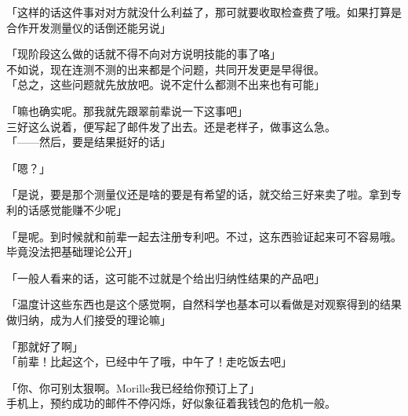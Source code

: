 「这样的话这件事对对方就没什么利益了，那可就要收取检查费了哦。如果打算是合作开发测量仪的话倒还能另说」

「现阶段这么做的话就不得不向对方说明技能的事了咯」\\

不如说，现在连测不测的出来都是个问题，共同开发更是早得很。\\

「总之，这些问题就先放放吧。说不定什么都测不出来也有可能」

「嘛也确实呢。那我就先跟翠前辈说一下这事吧」\\

三好这么说着，便写起了邮件发了出去。还是老样子，做事这么急。\\

「——然后，要是结果挺好的话」

「嗯？」

「是说，要是那个测量仪还是啥的要是有希望的话，就交给三好来卖了啦。拿到专利的话感觉能赚不少呢」

「是呢。到时候就和前辈一起去注册专利吧。不过，这东西验证起来可不容易哦。毕竟没法把基础理论公开」

「一般人看来的话，这可能不过就是个给出归纳性结果的产品吧」

「温度计这些东西也是这个感觉啊，自然科学也基本可以看做是对观察得到的结果做归纳，成为人们接受的理论嘛」

「那就好了啊」\\

「前辈！比起这个，已经中午了哦，中午了！走吃饭去吧」

「你、你可别太狠啊。Morille我已经给你预订上了」\\

手机上，预约成功的邮件不停闪烁，好似象征着我钱包的危机一般。\\

